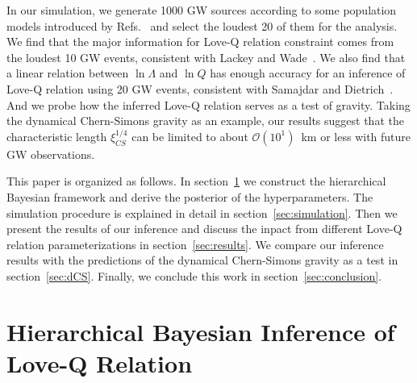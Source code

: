 \documentclass[a4paper,11pt]{article}
\begin{document}
In our simulation, we generate 1000 GW sources according to some population models 
introduced by Refs.~\cite{Fishbach:2018edt,Farrow:2019xnc,Samajdar:2020xrd} and 
select the loudest 20 of them for the analysis. We find that the major information 
for Love-Q relation constraint comes from the loudest 10 GW events, consistent 
with Lackey and Wade~\cite{Lackey:2014fwa}. We also find that a linear relation 
between $\ln\Lambda$ and $\ln Q$ has enough accuracy for an inference of Love-Q 
relation using 20 GW events, consistent with Samajdar and Dietrich~\cite{Samajdar:2020xrd}. 
And we probe how the inferred Love-Q relation serves as a test of gravity. 
Taking the dynamical Chern-Simons gravity as an example, our results 
suggest that the characteristic length $\xi_{CS}^{1/4}$ can be limited to about 
$\mathcal{O}(10^1)$~km or less with future GW observations. 

This paper is organized as follows. In section~\ref{sec:framework} we construct 
the hierarchical Bayesian framework and derive the posterior of the hyperparameters. 
The simulation procedure is explained in detail in section~\ref{sec:simulation}. 
Then we present the results of our inference and discuss the inpact from different 
Love-Q relation parameterizations in section~\ref{sec:results}. 
We compare our inference results with the predictions of the dynamical Chern-Simons 
gravity as a test in section~\ref{sec:dCS}. Finally, we conclude this work in section~\ref{sec:conclusion}.


\section{Hierarchical Bayesian Inference of Love-Q Relation}
\label{sec:framework}

\end{document}
